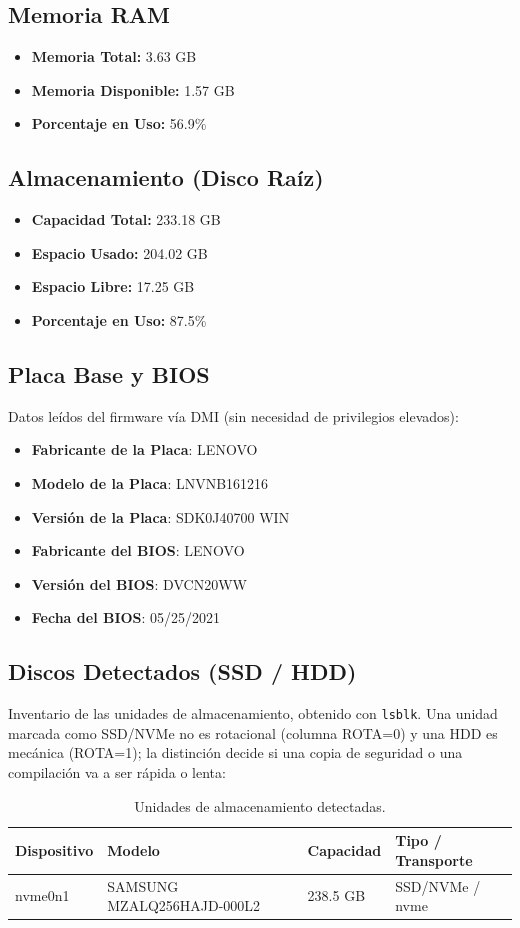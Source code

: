 \documentclass[11pt,a4paper]{article}
\begin{document}
\subsection{Memoria RAM}
\begin{itemize}
    \item \textbf{Memoria Total:} 3.63 GB
    \item \textbf{Memoria Disponible:} 1.57 GB
    \item \textbf{Porcentaje en Uso:} 56.9\%
\end{itemize}

\subsection{Almacenamiento (Disco Raíz)}
\begin{itemize}
    \item \textbf{Capacidad Total:} 233.18 GB
    \item \textbf{Espacio Usado:} 204.02 GB
    \item \textbf{Espacio Libre:} 17.25 GB
    \item \textbf{Porcentaje en Uso:} 87.5\%
\end{itemize}

\subsection{Placa Base y BIOS}
Datos leídos del firmware vía DMI (sin necesidad de privilegios elevados):
\begin{itemize}
  \item \textbf{Fabricante de la Placa}: LENOVO
  \item \textbf{Modelo de la Placa}: LNVNB161216
  \item \textbf{Versión de la Placa}: SDK0J40700 WIN
  \item \textbf{Fabricante del BIOS}: LENOVO
  \item \textbf{Versión del BIOS}: DVCN20WW
  \item \textbf{Fecha del BIOS}: 05/25/2021
\end{itemize}


\subsection{Discos Detectados (SSD / HDD)}
Inventario de las unidades de almacenamiento, obtenido con \texttt{lsblk}. Una unidad marcada como SSD/NVMe no es rotacional (columna ROTA=0) y una HDD es mecánica (ROTA=1); la distinción decide si una copia de seguridad o una compilación va a ser rápida o lenta:
\begin{table}[h!]
\centering
\begin{tabular}{llll}
\hline
\textbf{Dispositivo} & \textbf{Modelo} & \textbf{Capacidad} & \textbf{Tipo / Transporte} \\ \hline
nvme0n1 & SAMSUNG MZALQ256HAJD-000L2 & 238.5 GB & SSD/NVMe / nvme \\
\hline
\end{tabular}
\caption{Unidades de almacenamiento detectadas.}
\end{table}
\end{document}
